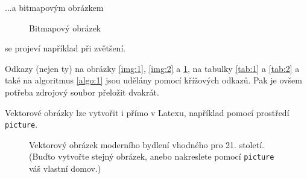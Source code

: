 \documentclass[a4paper,11pt, hidelinks]{article}
\begin{document}
...a bitmapovým obrázkem
\begin{figure}[h]
    \centering
    \caption{Bitmapový obrázek}
    \label{img:3}
\end{figure}

se projeví například při zvětšení.

Odkazy (nejen ty) na obrázky \ref*{img:1}, \ref*{img:2} a \ref*{img:3}, na tabulky \ref*{tab:1} a \ref*{tab:2} a také na algoritmus \ref*{algo:1} jsou udělány pomocí křížových odkazů. Pak je ovšem potřeba zdrojový soubor přeložit dvakrát.

Vektorové obrázky lze vytvořit i přímo v Latexu, například pomocí prostředí \texttt{picture}.

\newpage

\begin{landscape}

\begin{figure}

\caption{Vektorový obrázek moderního bydlení vhodného pro 21. století. (Buďto vytvořte stejný obrázek, anebo nakreslete pomocí \texttt{picture} váš vlastní domov.)}
\end{figure}

\end{landscape}
\end{document}

